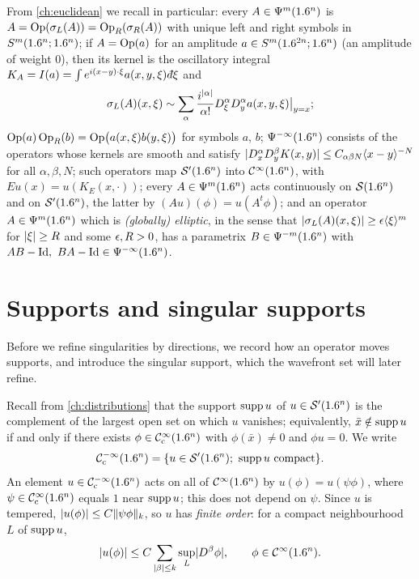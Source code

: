 From \cref{ch:euclidean} we recall in particular: every $A\in\Psi^{m}(1.6^n)$
is $A=\operatorname{Op}(\sigma_L(A))=\operatorname{Op}_R(\sigma_R(A))$ with unique left and right
symbols in $S^m(1.6^n;1.6^n)$; if $A=\operatorname{Op}(a)$ for an amplitude
$a\in S^m(1.6^{2n};1.6^n)$ (an amplitude of weight $0$), then its kernel is the
oscillatory integral $K_A=I(a)=\int e^{i(x-y)\cdot\xi}a(x,y,\xi)\,\dbar\xi$
and
\begin{equation}\label{microlocal:eq:reduction}
  \sigma_L(A)(x,\xi)\sim\sum_\alpha\frac{i^{\lvert \alpha\rvert}}{\alpha!}
  D^\alpha_\xi D^\alpha_ya(x,y,\xi)\big|_{y=x};
\end{equation}
$\operatorname{Op}(a)\operatorname{Op}_R(b)=\operatorname{Op}\bigl(a(x,\xi)b(y,\xi)\bigr)$ for symbols $a$, $b$;
$\Psi^{-\infty}(1.6^n)$ consists of the operators whose kernels are smooth
and satisfy $\lvert D^\alpha_xD^\beta_yK(x,y)\rvert\le C_{\alpha\beta N}\langle x-y\rangle^{-N}$
for all $\alpha,\beta,N$; such operators map $\mathcal{S}'(1.6^n)$ into $\mathcal{C}^\infty(1.6^n)$,
with $Eu(x)=u(K_E(x,\cdot))$; every $A\in\Psi^{m}(1.6^n)$ acts continuously
on $\mathcal{S}(1.6^n)$ and on $\mathcal{S}'(1.6^n)$, the latter by
$(Au)(\phi)=u(A^t\phi)$; and an operator $A\in\Psi^{m}(1.6^n)$ which is
\emph{(globally) elliptic}, in the sense that
$\lvert \sigma_L(A)(x,\xi)\rvert\ge\epsilon\langle \xi\rangle^m$ for $\lvert \xi\rvert\ge R$ and some
$\epsilon,R>0$, has a parametrix $B\in\Psi^{-m}(1.6^n)$ with
$AB-\Id,\ BA-\Id\in\Psido{-\infty}(\R^n)$.

\section{Supports and singular supports}\label{microlocal:sec:supports}

Before we refine singularities by directions, we record how an operator moves
supports, and introduce the singular support, which the wavefront set will
later refine.

Recall from \cref{ch:distributions} that the support $\operatorname{supp} u$ of
$u\in\mathcal{S}'(1.6^n)$ is the complement of the largest open set on which $u$
vanishes; equivalently, $\bar x\notin\operatorname{supp} u$ if and only if there exists
$\phi\in\mathcal{C}^\infty_{\mathrm{c}}(1.6^n)$ with $\phi(\bar x)\ne0$ and $\phi u=0$. We write
\begin{equation*}
  \CmIc(\R^n)=\{u\in\cSp(\R^n);\ \supp u\text{ compact}\}.
\end{equation*}
An element $u\in\mathcal{C}^{-\infty}_{\mathrm{c}}(1.6^n)$ acts on all of $\mathcal{C}^\infty(1.6^n)$ by
$u(\phi)=u(\psi\phi)$, where $\psi\in\mathcal{C}^\infty_{\mathrm{c}}(1.6^n)$ equals $1$ near $\operatorname{supp} u$;
this does not depend on $\psi$. Since $u$ is tempered,
$\lvert u(\phi)\rvert\le C\lVert \psi\phi\rVert_k$, so $u$ has \emph{finite order}: for a
compact neighbourhood $L$ of $\operatorname{supp} u$,
\begin{equation}\label{microlocal:eq:finite-order}
  \lvert u(\phi)\rvert\le C\sum_{\lvert \beta\rvert\le k}\sup_{L}\lvert D^\beta\phi\rvert,
  \qquad\phi\in\mathcal{C}^\infty(1.6^n).
\end{equation}


